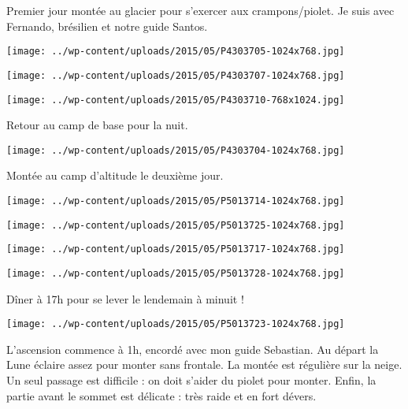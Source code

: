 Premier jour montée au glacier pour s'exercer aux crampons/piolet. Je suis avec Fernando, brésilien et notre guide Santos. 
\begin{center} \texttt{[image: ../wp-content/uploads/2015/05/P4303705-1024x768.jpg]} \end{center}
\begin{center} \texttt{[image: ../wp-content/uploads/2015/05/P4303707-1024x768.jpg]} \end{center}

\begin{center} \texttt{[image: ../wp-content/uploads/2015/05/P4303710-768x1024.jpg]} \end{center}

Retour au camp de base pour la nuit. 
\begin{center} \texttt{[image: ../wp-content/uploads/2015/05/P4303704-1024x768.jpg]} \end{center}
\pagebreak

Montée au camp d'altitude le deuxième jour. 
\begin{center} \texttt{[image: ../wp-content/uploads/2015/05/P5013714-1024x768.jpg]} \end{center}
\begin{center} \texttt{[image: ../wp-content/uploads/2015/05/P5013725-1024x768.jpg]} \end{center}

\begin{center} \texttt{[image: ../wp-content/uploads/2015/05/P5013717-1024x768.jpg]} \end{center}
\begin{center} \texttt{[image: ../wp-content/uploads/2015/05/P5013728-1024x768.jpg]} \end{center}
\pagebreak

Dîner à 17h pour se lever le lendemain à minuit ! 
\begin{center} \texttt{[image: ../wp-content/uploads/2015/05/P5013723-1024x768.jpg]} \end{center}

L'ascension commence à 1h, encordé avec mon guide Sebastian. Au départ la Lune éclaire assez pour monter sans frontale. La montée est régulière sur la neige. Un seul passage est difficile : on doit s'aider du piolet pour monter. Enfin, la partie avant le sommet est délicate : très raide et en fort dévers. 

